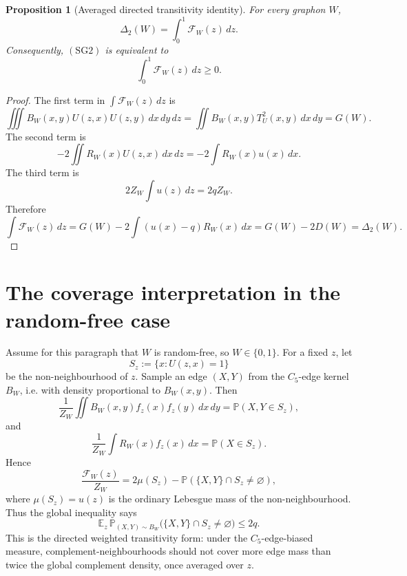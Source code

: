 \documentclass[11pt]{article}
\newtheorem{proposition}{Proposition}
\newcommand{\dd}{\,d}
\newcommand{\DeltaTwo}{\Delta_2}
\begin{document}
\begin{proposition}[Averaged directed transitivity identity]
For every graphon \(W\),
\begin{equation}
\boxed{\DeltaTwo(W)=\int_0^1 \mathcal F_W(z)\dd z.}
\label{eq:avgF}
\end{equation}
Consequently, \((\mathrm{SG2})\) is equivalent to
\begin{equation}
\boxed{\int_0^1 \mathcal F_W(z)\dd z\ge0.}
\end{equation}
\end{proposition}

\begin{proof}
The first term in \(\int\mathcal F_W(z)\dd z\) is
\[
\iiint B_W(x,y)U(z,x)U(z,y)\dd x\dd y\dd z
=\iint B_W(x,y)T_U^2(x,y)\dd x\dd y=G(W).
\]
The second term is
\[
-2\iint R_W(x)U(z,x)\dd x\dd z
=-2\int R_W(x)u(x)\dd x.
\]
The third term is
\[
2Z_W\int u(z)\dd z=2qZ_W.
\]
Therefore
\[
\int \mathcal F_W(z)\dd z
=G(W)-2\int (u(x)-q)R_W(x)\dd x
=G(W)-2D(W)=\DeltaTwo(W).
\]
\end{proof}

\section{The coverage interpretation in the random-free case}

Assume for this paragraph that \(W\) is random-free, so \(W\in\{0,1\}\).  For a
fixed \(z\), let
\[
S_z:=\{x:U(z,x)=1\}
\]
be the non-neighbourhood of \(z\).  Sample an edge \((X,Y)\) from the \(C_5\)-edge kernel \(B_W\), i.e. with density proportional to
\(B_W(x,y)\).  Then
\[
\frac{1}{Z_W}\iint B_W(x,y)f_z(x)f_z(y)\dd x\dd y
=\mathbb P(X,Y\in S_z),
\]
and
\[
\frac{1}{Z_W}\int R_W(x)f_z(x)\dd x
=\mathbb P(X\in S_z).
\]
Hence
\begin{equation}
\frac{\mathcal F_W(z)}{Z_W}
=2\mu(S_z)-\mathbb P(\{X,Y\}\cap S_z\ne\varnothing),
\label{eq:coverage}
\end{equation}
where \(\mu(S_z)=u(z)\) is the ordinary Lebesgue mass of the non-neighbourhood.
Thus the global inequality says
\begin{equation}
\boxed{
\mathbb E_{z}\,\mathbb P_{(X,Y)\sim B_W}\bigl(\{X,Y\}\cap S_z\ne\varnothing\bigr)
\le 2q.}
\label{eq:coverage-global}
\end{equation}
This is the directed weighted transitivity form: under the \(C_5\)-edge-biased
measure, complement-neighbourhoods should not cover more edge mass than twice
the global complement density, once averaged over \(z\).
\end{document}
